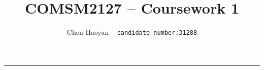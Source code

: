 \documentclass[12pt]{article}
\title{COMSM2127 -- Coursework 1}
\author{Chen Haoyan -- \texttt{candidate number:31288}}
\begin{document}
  \maketitle

  \vspace{-0.3in}
  \noindent
  \rule{\linewidth}{0.4pt}

  \noindent


\end{document}
